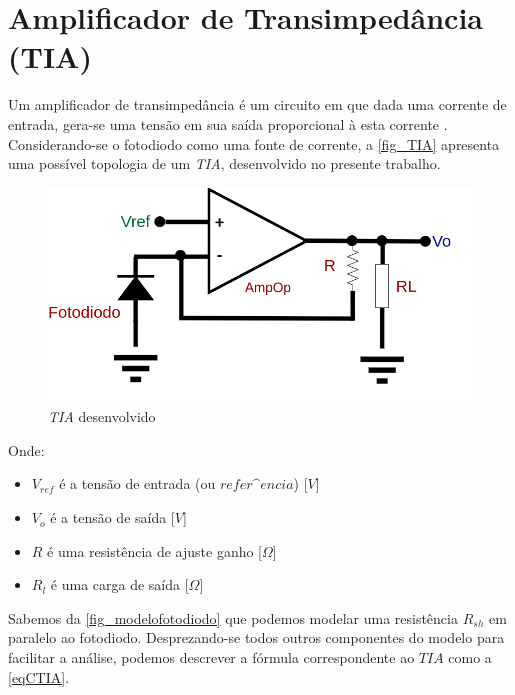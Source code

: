 \section{Amplificador de Transimped\^ancia (TIA)}
\label{section:TIA}

Um amplificador de transimped\^ancia \'e um circuito em que dada uma corrente de entrada, gera-se uma tens\~ao em sua sa\'ida proporcional \`a esta corrente \cite{RazaviFundM}. Considerando-se o fotodiodo como uma fonte de corrente, a \autoref{fig_TIA} apresenta uma poss\'ivel topologia de um \emph{TIA}, desenvolvido no presente trabalho.

\begin{figure}[htb]
	\caption{\label{fig_TIA}\emph{TIA} desenvolvido}
	\begin{center}
	    \includegraphics[scale=0.4]{Circuitos/TIA.png}
	\end{center}
\end{figure}

Onde:

\begin{itemize}
    \item $V_{ref}$ \'e a tens\~ao de entrada (ou $refer\^encia$) [$V$]
    \item $V_o$ \'e a tens\~ao de sa\'ida [$V$]
    \item $R$ \'e uma resist\^encia de ajuste ganho [$\Omega$]
    \item $R_l$ \'e uma carga de sa\'ida [$\Omega$]
\end{itemize}

Sabemos da \autoref{fig_modelofotodiodo} que podemos modelar uma resist\^encia $R_{sh}$ em paralelo ao fotodiodo. Desprezando-se todos outros componentes do modelo para facilitar a an\'alise, podemos descrever a f\'ormula correspondente ao $TIA$ como a \autoref{eqCTIA}.

